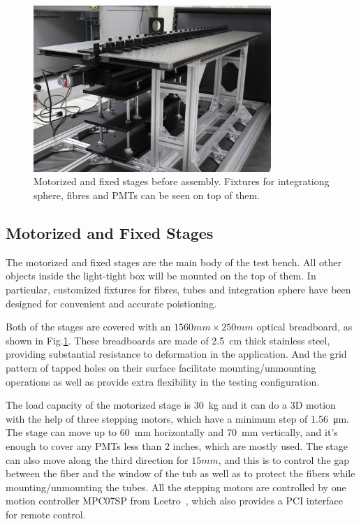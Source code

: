 \documentclass[5p, times]{elsarticle}
\begin{document}
\begin{figure}
 \centering
 \includegraphics[width=90mm]{stage1_crop}
\caption{Motorized and fixed stages before assembly.
Fixtures for integrationg sphere, fibres and PMTs can be seen on top of them.}
\label{fig:stages}
\end{figure} 

\subsection{Motorized and Fixed Stages}
\label{sec:stages}

The motorized and fixed stages are the main body of the test bench.
All other objects inside the light-tight box will be mounted on the top of them.
In particular, customized fixtures for fibres, tubes and integration sphere have been designed for convenient and accurate poistioning.

Both of the stages are covered with an $1560mm\times250mm$ optical breadboard, as shown in Fig.\ref{fig:stages}.
These breadboards are made of \SI{2.5}{cm} thick stainless steel, providing substantial resistance to deformation in the application. 
And the grid pattern of tapped holes on their surface facilitate mounting/unmounting operations as well as provide extra flexibility in the testing configuration.

The load capacity of the motorized stage is \SI{30}{\kilo\gram} and it can do a 3D motion with the help of three stepping motors, which have a minimum step of \SI{1.56}{\micro\meter}.
The stage can move up to \SI{60}{\milli\meter} horizontally and \SI{70}{\milli\meter} vertically, and it's enough to cover any PMTs less than 2 inches, which are mostly used.
The stage can also move along the third direction for $15mm$, and this is to control the gap between the fiber and the window of the tub as well as to protect the fibers while mounting/unmounting the tubes.
All the stepping motors are controlled by one motion controller MPC07SP from Leetro~\cite{leetro}, which also provides a PCI interface for remote control.
\end{document}
